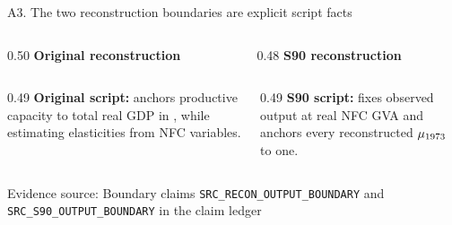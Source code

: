 \documentclass[10pt,aspectratio=169]{beamer}
\newcommand{\sourcefooter}[1]{%
  \par\vfill{\tiny\color{gray!70}Evidence source: #1}\vspace{-0.35em}}
\begin{document}
\begin{frame}{A3. The two reconstruction boundaries are explicit script facts}
  \begin{columns}[T,onlytextwidth]
    \begin{column}{0.50\textwidth}
      \textbf{Original reconstruction}
      
    \end{column}
    \begin{column}{0.48\textwidth}
      \textbf{S90 reconstruction}
      
    \end{column}
  \end{columns}
  \vspace{-0.55em}
  \begin{columns}[T,onlytextwidth]
    \begin{column}{0.49\textwidth}
      \scriptsize\textbf{Original script:} anchors productive capacity to total real GDP in \AnchorYear, while estimating elasticities from NFC variables.
    \end{column}
    \begin{column}{0.49\textwidth}
      \scriptsize\textbf{S90 script:} fixes observed output at real NFC GVA and anchors every reconstructed $\mu_{1973}$ to one.
    \end{column}
  \end{columns}
  \sourcefooter{Boundary claims \texttt{SRC\_RECON\_OUTPUT\_BOUNDARY} and \texttt{SRC\_S90\_OUTPUT\_BOUNDARY} in the claim ledger}
\end{frame}
\end{document}
